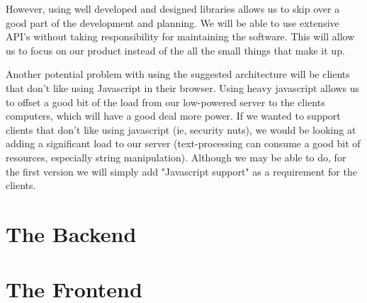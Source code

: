 However, using well developed and designed libraries allows us to skip over a good part of the development and planning. We will be able to use extensive API's without taking responsibility for maintaining the software. This will allow us to focus on our product instead of the all the small things that make it up. 

Another potential problem with using the suggested architecture will be clients that don't like using Javascript in their browser. Using heavy javascript allows us to offset a good bit of the load from our low-powered server to the clients computers, which will have a good deal more power. If we wanted to support clients that don't like using javascript (ie, security nuts), we would be looking at adding a significant load to our server (text-processing can consume a good bit of resources, especially string manipulation). Although we may be able to do, for the first version we will simply add "Javascript support" as a requirement for the clients.

\section{The Backend}








\section{The Frontend}









